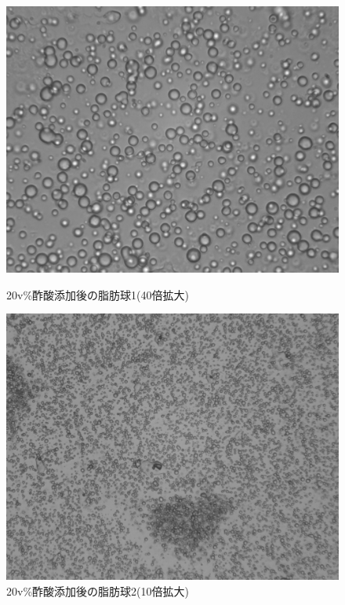 \documentclass[11pt]{ltjsarticle}
\begin{document}
      \begin{figure}[H]
        \centering
        \begin{minipage}{0.48\textwidth}
          \centering
          \includegraphics[width=\linewidth]{mizumoto_20_1.png}
          \caption{20v\%酢酸添加後の脂肪球1(40倍拡大)}
          \label{fig:milk20_1}
        \end{minipage}
        \hfill
        \begin{minipage}{0.48\textwidth}
          \centering
          \includegraphics[width=\linewidth]{mizumoto_20_2.png}
          \caption{20v\%酢酸添加後の脂肪球2(10倍拡大)}
          \label{fig:milk20_2}
        \end{minipage}
      \end{figure}
\end{document}
